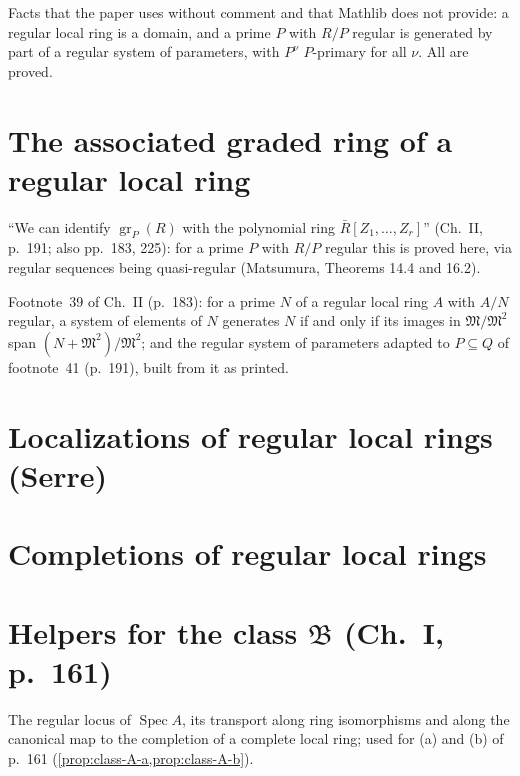 Facts that the paper uses without comment and that Mathlib does not provide: a regular local ring
is a domain, and a prime $P$ with $R/P$ regular is generated by part of a regular system of
parameters, with $P^\nu$ $P$-primary for all $\nu$.  All are proved.


\section{The associated graded ring of a regular local ring}

``We can identify $\operatorname{gr}_P(R)$ with the polynomial ring $\bar R[Z_1,\dots,Z_r]$''
(Ch.~II, p.~191; also pp.~183, 225): for a prime $P$ with $R/P$ regular this is proved here, via
regular sequences being quasi-regular (Matsumura, Theorems 14.4 and 16.2).


Footnote~39 of Ch.~II (p.~183): for a prime $N$ of a regular local ring $A$ with $A/N$ regular, a system of elements of $N$
generates $N$ if and only if its images in $\mathfrak M/\mathfrak M^2$ span $(N+\mathfrak M^2)/\mathfrak M^2$; and the regular
system of parameters adapted to $P\subseteq Q$ of footnote~41 (p.~191), built from it as printed.


\section{Localizations of regular local rings (Serre)}

\section{Completions of regular local rings}

\section{Helpers for the class $\mathfrak B$ (Ch.~I, p.~161)}
The regular locus of $\operatorname{Spec}A$, its transport along ring isomorphisms and along the
canonical map to the completion of a complete local ring; used for (a) and (b) of p.~161
(\cref{prop:class-A-a,prop:class-A-b}).

